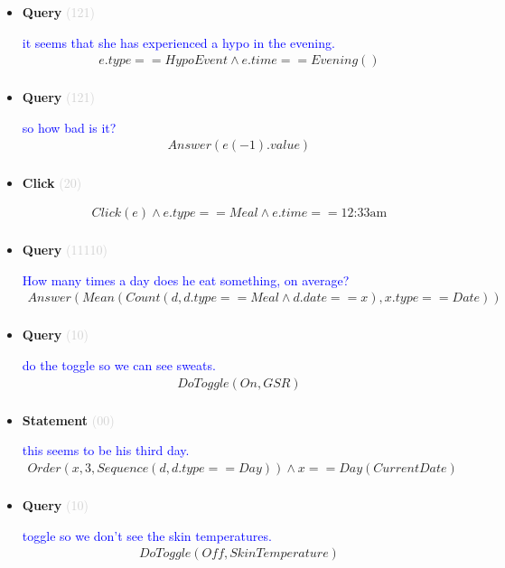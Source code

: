 \documentclass[11pt]{article}
\newcommand{\key}[1]{\textcolor{lightgray}{#1}}
\newcounter{CQuery}
\newcounter{CStatement}
\newcounter{CClick}
\begin{document}
\begin{itemize}
\item
\textbf{Query\theCQuery} \key{(121)} \addtocounter{CQuery}{1}
\textcolor{blue}{ it seems that she has experienced a hypo in the evening. }
\begin{multline*}
e.type==HypoEvent \wedge e.time==Evening() \\ 
\end{multline*}


\item
\textbf{Query\theCQuery} \key{(121)} \addtocounter{CQuery}{1}
\textcolor{blue}{ so how bad is it? }
\begin{multline*}
Answer(e(-1).value) \\ 
\end{multline*}


\item
\textbf{Click\theCClick} \key{(20)} \addtocounter{CClick}{1}
\textcolor{blue}{  }
\begin{multline*}
Click(e) \wedge e.type==Meal \wedge e.time==\mbox{12:33am} \\ 
\end{multline*}


\item
\textbf{Query\theCQuery} \key{(11110)} \addtocounter{CQuery}{1}
\textcolor{blue}{ How many times a day does he eat something, on average? }
\begin{multline*}
Answer(Mean(Count(d, d.type==Meal \wedge d.date==x), x.type==Date)) \\ 
\end{multline*}


\item
\textbf{Query\theCQuery} \key{(10)} \addtocounter{CQuery}{1}
\textcolor{blue}{ do the toggle so we can see sweats. }
\begin{multline*}
DoToggle(On, GSR) \\ 
\end{multline*}


\item
\textbf{Statement\theCStatement} \key{(00)} \addtocounter{CStatement}{1}
\textcolor{blue}{ this seems to be his third day. }
\begin{multline*}
Order(x, 3, Sequence(d, d.type==Day)) \wedge x==Day(CurrentDate) \\ 
\end{multline*}


\item
\textbf{Query\theCQuery} \key{(10)} \addtocounter{CQuery}{1}
\textcolor{blue}{ toggle so we don't see the skin temperatures. }
\begin{multline*}
DoToggle(Off, SkinTemperature) \\ 
\end{multline*}



\end{itemize}
\end{document}
